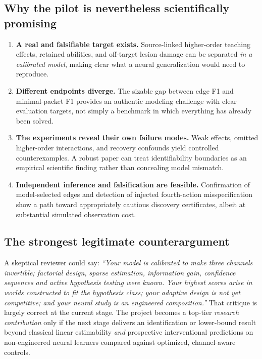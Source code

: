 \documentclass[10.5pt,a4paper]{article}
\begin{document}
\subsection{Why the pilot is nevertheless scientifically promising}
\begin{enumerate}
\item \textbf{A real and falsifiable target exists.} Source-linked higher-order teaching effects, retained abilities, and off-target lesion damage can be separated \emph{in a calibrated model}, making clear what a neural generalization would need to reproduce.
\item \textbf{Different endpoints diverge.} The sizable gap between edge F1 and minimal-packet F1 provides an authentic modeling challenge with clear evaluation targets, not simply a benchmark in which everything has already been solved.
\item \textbf{The experiments reveal their own failure modes.} Weak effects, omitted higher-order interactions, and recovery confounds yield controlled counterexamples. A robust paper can treat identifiability boundaries as an empirical scientific finding rather than concealing model mismatch.
\item \textbf{Independent inference and falsification are feasible.} Confirmation of model-selected edges and detection of injected fourth-action misspecification show a path toward appropriately cautious discovery certificates, albeit at substantial simulated observation cost.
\end{enumerate}

\subsection{The strongest legitimate counterargument}
A skeptical reviewer could say: \emph{``Your model is calibrated to make three channels invertible; factorial design, sparse estimation, information gain, confidence sequences and active hypothesis testing were known. Your highest scores arise in worlds constructed to fit the hypothesis class; your adaptive design is not yet competitive; and your neural study is an engineered composition.''} That critique is largely correct at the current stage. The project becomes a top-tier \emph{research contribution} only if the next stage delivers an identification or lower-bound result beyond classical linear estimability \emph{and} prospective interventional predictions on non-engineered neural learners compared against optimized, channel-aware controls.
\end{document}
